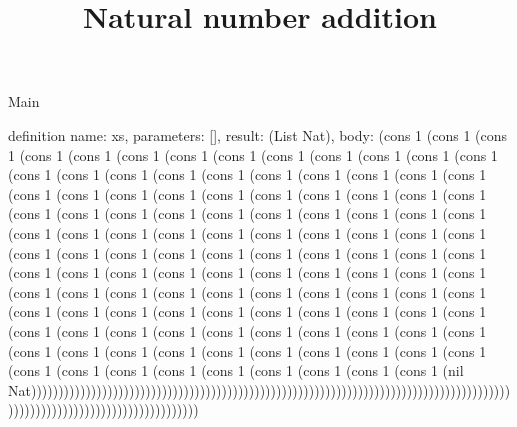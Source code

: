 \begin{lexlean}{Main}
\title{Natural number addition}
\begin{semanticmodule}
definition{ name: xs, parameters: [], result: (List Nat), body: (cons 1 (cons 1 (cons 1 (cons 1 (cons 1 (cons 1 (cons 1 (cons 1 (cons 1 (cons 1 (cons 1 (cons 1 (cons 1 (cons 1 (cons 1 (cons 1 (cons 1 (cons 1 (cons 1 (cons 1 (cons 1 (cons 1 (cons 1 (cons 1 (cons 1 (cons 1 (cons 1 (cons 1 (cons 1 (cons 1 (cons 1 (cons 1 (cons 1 (cons 1 (cons 1 (cons 1 (cons 1 (cons 1 (cons 1 (cons 1 (cons 1 (cons 1 (cons 1 (cons 1 (cons 1 (cons 1 (cons 1 (cons 1 (cons 1 (cons 1 (cons 1 (cons 1 (cons 1 (cons 1 (cons 1 (cons 1 (cons 1 (cons 1 (cons 1 (cons 1 (cons 1 (cons 1 (cons 1 (cons 1 (cons 1 (cons 1 (cons 1 (cons 1 (cons 1 (cons 1 (cons 1 (cons 1 (cons 1 (cons 1 (cons 1 (cons 1 (cons 1 (cons 1 (cons 1 (cons 1 (cons 1 (cons 1 (cons 1 (cons 1 (cons 1 (cons 1 (cons 1 (cons 1 (cons 1 (cons 1 (cons 1 (cons 1 (cons 1 (cons 1 (cons 1 (cons 1 (cons 1 (cons 1 (cons 1 (cons 1 (cons 1 (cons 1 (cons 1 (cons 1 (cons 1 (cons 1 (cons 1 (cons 1 (cons 1 (cons 1 (cons 1 (cons 1 (cons 1 (cons 1 (cons 1 (cons 1 (cons 1 (cons 1 (cons 1 (cons 1 (cons 1 (cons 1 (nil Nat))))))))))))))))))))))))))))))))))))))))))))))))))))))))))))))))))))))))))))))))))))))))))))))))))))))))))))))))))))))))))) }
\end{semanticmodule}
\end{lexlean}
